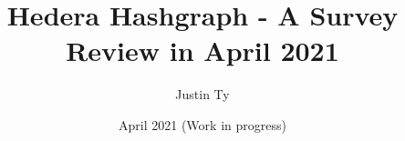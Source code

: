 \documentclass{article}
\begin{document}

\author{Justin Ty}
\title{Hedera Hashgraph - A Survey Review in April 2021 }
\date{April 2021 (Work in progress)}

\maketitle






\printbibliography

\end{document}
